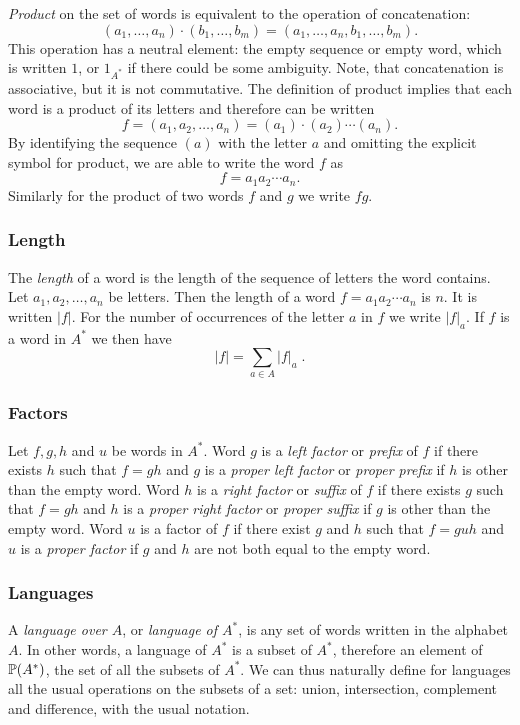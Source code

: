 \emph{Product} on the set of words is equivalent to the operation of concatenation:
\[
    (a_1, \dotsc, a_n) \cdot (b_1, \dotsc, b_m) = (a_1, \dotsc, a_n, b_1, \dotsc, b_m).
\]
This operation has a neutral element: the empty sequence or empty word, which is written $1$, or $1_{A^*}$ if there could be some ambiguity. Note, that concatenation is associative, but it is not commutative. The definition of product implies that each word is a product of its letters and therefore can be written
\[
    f = (a_1, a_2, \dotsc, a_n) = (a_1) \cdot (a_2) \dotsm (a_n).
\]
By identifying the sequence $(a)$ with the letter $a$ and omitting the explicit symbol for product, we are able to write the word $f$ as
\[
    f = a_1 a_2 \dotsm a_n.
\]
Similarly for the product of two words $f$ and $g$ we write $fg$.

\subsubsection*{Length}

The \emph{length} of a word is the length of the sequence of letters the word contains. Let $a_1, a_2, \dotsc, a_n$ be letters. Then the length of a word $f = a_1 a_2 \dotsm a_n$ is $n$. It is written $|f|$. For the number of occurrences of the letter $a$ in $f$ we write $|f|_a$. If $f$ is a word in $A^*$ we then have
\[
    |f| = \sum_{a \in A} |f|_a \; .
\]

\subsubsection*{Factors}

Let $f, g, h$ and $u$ be words in $A^*$. Word $g$ is a \emph{left factor} or \emph{prefix} of $f$ if there exists $h$ such that $f = g h$ and $g$ is a \emph{proper left factor} or \emph{proper prefix} if $h$ is other than the empty word. Word $h$ is a \emph{right factor} or \emph{suffix} of $f$ if there exists $g$ such that $f = g h$ and $h$ is a \emph{proper right factor} or \emph{proper suffix} if $g$ is other than the empty word. Word $u$ is a factor of $f$ if there exist $g$ and $h$ such that $f = g u h$ and $u$ is a \emph{proper factor} if $g$ and $h$ are not both equal to the empty word.

\subsubsection*{Languages}

A \emph{language over $A$}, or \emph{language of $A^*$}, is any set of words written in the alphabet $A$. In other words, a language of $A^*$ is a subset of $A^*$, therefore an element of $\mathbb{P}(A^*)$, the set of all the subsets of $A^*$. We can thus naturally define for languages all the usual operations on the subsets of a set: union, intersection, complement and difference, with the usual notation.

